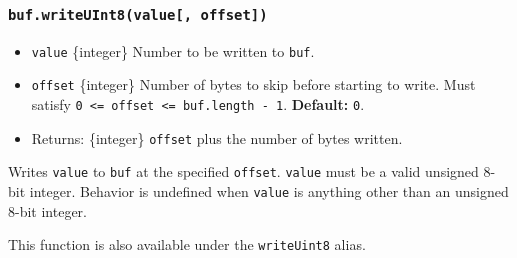 \begin{Shaded}
\begin{Highlighting}[]
\NormalTok{ \{ }\NormalTok{ \} }\OperatorTok{=} \NormalTok{(}\NormalTok{)}\OperatorTok{;}

\OperatorTok{=} \NormalTok{(}\NormalTok{)}\OperatorTok{;}

\NormalTok{(}\OperatorTok{,} \OperatorTok{,} \NormalTok{)}\OperatorTok{;}

\OperatorTok{;}
\end{Highlighting}
\end{Shaded}

\subsubsection{\texorpdfstring{\texttt{buf.writeUInt8(value{[},\ offset{]})}}{buf.writeUInt8(value{[}, offset{]})}}\label{buf.writeuint8value-offset}

\begin{itemize}
\tightlist
\item
  \texttt{value} \{integer\} Number to be written to \texttt{buf}.
\item
  \texttt{offset} \{integer\} Number of bytes to skip before starting to
  write. Must satisfy
  \texttt{0\ \textless{}=\ offset\ \textless{}=\ buf.length\ -\ 1}.
  \textbf{Default:} \texttt{0}.
\item
  Returns: \{integer\} \texttt{offset} plus the number of bytes written.
\end{itemize}

Writes \texttt{value} to \texttt{buf} at the specified \texttt{offset}.
\texttt{value} must be a valid unsigned 8-bit integer. Behavior is
undefined when \texttt{value} is anything other than an unsigned 8-bit
integer.

This function is also available under the \texttt{writeUint8} alias.

